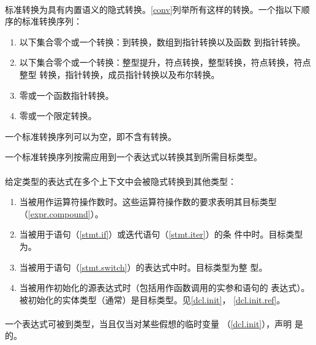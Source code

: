 \paragraph{} %
标准转换为具有内置语义的隐式转换。\ref{conv}列举所有这样的转换。一个指以下顺序的标准转换序列：
\begin{enumerate}
  \item 以下集合零个或一个转换：\lvalue{}到\rvalue{}转换，数组到指针转换以及函数
        到指针转换。
  \item 以下集合零个或一个转换：整型提升，符点转换，整型转换，符点转换，符点整型
        转换，指针转换，成员指针转换以及布尔转换。
  \item 零或一个函数指针转换。
  \item 零或一个限定转换。
\end{enumerate}

\begin{note}
  一个标准转换序列可以为空，即不含有转换。
\end{note}

一个标准转换序列按需应用到一个表达式以转换其到所需目标类型。

\paragraph{} %
\begin{note}
  给定类型的表达式在多个上下文中会被隐式转换到其他类型：
  \begin{enumerate}
    \item 当被用作运算符操作数时。这些运算符操作数的要求表明其目标类型
          （\ref{expr.compound}）。
    \item 当被用于语句（\ref{stmt.if}）或迭代语句（\ref{stmt.iter}）的条
          件中时。目标类型为。
    \item 当被用于语句（\ref{stmt.switch}）的表达式中时。目标类型为整
          型。
    \item 当被用作初始化的源表达式时（包括用作函数调用的实参和语句的
          表达式）。被初始化的实体类型（通常）是目标类型。见\ref{dcl.init}，
          \ref{dcl.init.ref}。
  \end{enumerate}
\end{note}

\paragraph{} %
一个表达式可被到类型，当且仅当对某些假想的临时变量
（\ref{dcl.init}），声明 \tm{;}是\wellform{}的。

